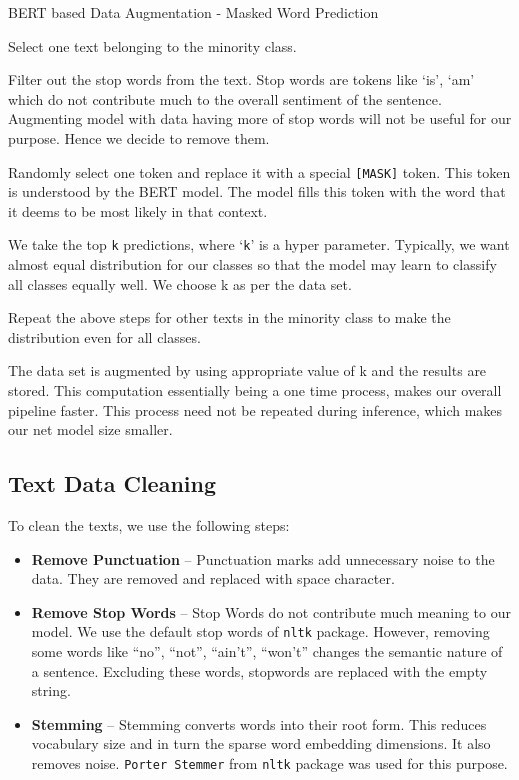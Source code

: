 \documentclass[conference]{IEEEtran}
\begin{document}
\begin{algorithm}[htbp]
\caption{BERT based Data Augmentation - Masked Word Prediction}
\label{algo:1}
\begin{algorithmic}[1]
    \STATE Select one text belonging to the minority class.
    
    \STATE Filter out the stop words from the text. Stop words are tokens like `is', `am' which do not contribute much to the overall sentiment of the sentence. Augmenting model with data having more of stop words will not be useful for our purpose. Hence we decide to remove them.
    
    \STATE Randomly select one token and replace it with a special \texttt{[MASK]} token. This token is understood by the BERT model. The model fills this token with the word that it deems to be most likely in that context.
    
    \STATE We take the top \texttt{k} predictions, where `\texttt{k}' is a hyper parameter. Typically, we want almost equal distribution for our classes so that the model may learn to classify all classes equally well. We choose k as per the data set.
    
    \STATE Repeat the above steps for other texts in the minority class to make the distribution even for all classes.
\end{algorithmic}
\end{algorithm}

The data set is augmented by using appropriate value of k and the results are stored. This computation essentially being a one time process, makes our overall pipeline faster. This process need not be repeated during inference, which makes our net model size smaller. 

\subsection{Text Data Cleaning}\label{subsec-clean}
To clean the texts, we use the following steps:\smallskip
\begin{itemize}
    \item \textbf{Remove Punctuation} -- Punctuation marks add unnecessary noise to the data. They are removed and replaced with space character.

    \item \textbf{Remove Stop Words} -- Stop Words do not contribute much meaning to our model. We use the default stop words of \texttt{nltk} package. However, removing some words like ``no'', ``not'', ``ain't'', ``won't'' changes the semantic nature of a sentence. Excluding these words, stopwords are replaced with the empty string. 
    
    \item \textbf{Stemming} -- Stemming converts words into their root form. This reduces vocabulary size and in turn the sparse word embedding dimensions. It also removes noise. \texttt{Porter Stemmer} from \texttt{nltk} package was used for this purpose.
\end{itemize}
\end{document}
